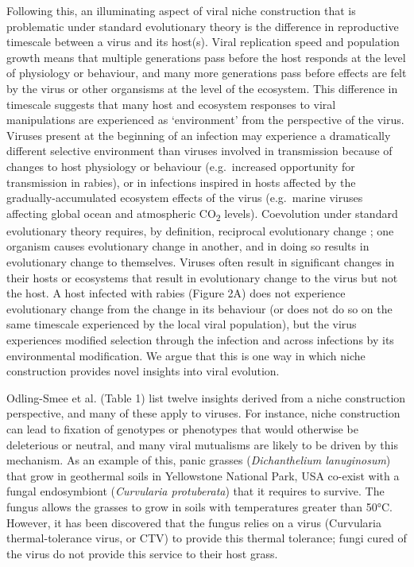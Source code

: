 \documentclass[review,draft,12pt]{elsarticle}
\begin{document}
Following this, an illuminating aspect of viral niche construction that
is problematic under standard evolutionary theory is the difference in
reproductive timescale between a virus and its host(s). Viral
replication speed and population growth means that multiple generations
pass before the host responds at the level of physiology or behaviour,
and many more generations pass before effects are felt by the virus or
other organsisms at the level of the ecosystem. This difference in
timescale suggests that many host and ecosystem responses to viral
manipulations are experienced as `environment' from the perspective of
the virus. Viruses present at the beginning of an infection may
experience a dramatically different selective environment than viruses
involved in transmission because of changes to host physiology or
behaviour (e.g.~increased opportunity for transmission in rabies), or in
infections inspired in hosts affected by the gradually-accumulated
ecosystem effects of the virus (e.g.~marine viruses affecting global
ocean and atmospheric CO\textsubscript{2} levels). Coevolution under
standard evolutionary theory requires, by definition, reciprocal
evolutionary change \citep{Matthews2014}; one organism causes
evolutionary change in another, and in doing so results in evolutionary
change to themselves. Viruses often result in significant changes in
their hosts or ecosystems that result in evolutionary change to the
virus but not the host. A host infected with rabies (Figure 2A) does not
experience evolutionary change from the change in its behaviour (or does
not do so on the same timescale experienced by the local viral
population), but the virus experiences modified selection through the
infection and across infections by its environmental modification. We
argue that this is one way in which niche construction provides novel
insights into viral evolution.

Odling-Smee et al. \citep{Odling-Smee:2013zr} (Table 1) list twelve
insights derived from a niche construction perspective, and many of
these apply to viruses. For instance, niche construction can lead to
fixation of genotypes or phenotypes that would otherwise be deleterious
or neutral, and many viral mutualisms are likely to be driven by this
mechanism. As an example of this, panic grasses (\emph{Dichanthelium
lanuginosum}) that grow in geothermal soils in Yellowstone National
Park, USA co-exist with a fungal endosymbiont (\emph{Curvularia
protuberata}) that it requires to survive. The fungus allows the grasses
to grow in soils with temperatures greater than 50°C. However, it has
been discovered that the fungus relies on a virus (Curvularia
thermal-tolerance virus, or CTV) to provide this thermal tolerance;
fungi cured of the virus do not provide this service to their host
grass.
\end{document}
